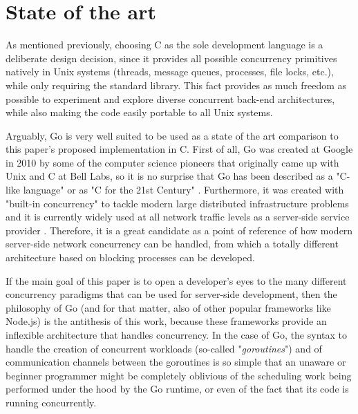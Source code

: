 \section{State of the art}
As mentioned previously, choosing C as the sole development language is a deliberate design decision, since it provides all possible concurrency primitives natively in Unix systems (threads, message queues, processes, file locks, etc.), while only requiring the standard library. This fact provides as much freedom as possible to experiment and explore diverse concurrent back-end architectures, while also making the code easily portable to all Unix systems.

Arguably, Go is very well suited to be used as a state of the art comparison to this paper's proposed implementation in C. First of all, Go was created at Google in 2010 by some of the computer science pioneers that originally came up with Unix and C at Bell Labs, so it is no surprise that Go has been described as a "C-like language" or as "C for the 21st Century" \cite{GoPL2015}. Furthermore, it was created with "built-in concurrency" to tackle modern large distributed infrastructure problems and it is currently widely used at all network traffic levels as a server-side service provider \cite{Pike2012}. Therefore, it is a great candidate as a point of reference of how modern server-side network concurrency can be handled, from which a totally different architecture based on blocking processes can be developed. 

If the main goal of this paper is to open a developer's eyes to the many different concurrency paradigms that can be used for server-side development, then the philosophy of Go (and for that matter, also of other popular frameworks like Node.js) is the antithesis of this work, because these frameworks provide an inflexible architecture that handles concurrency. In the case of Go, the syntax to handle the creation of concurrent workloads (so-called "\textit{goroutines}") and of communication channels between the goroutines is so simple that an unaware or beginner programmer might be completely oblivious of the scheduling work being performed under the hood by the Go runtime, or even of the fact that its code is running concurrently. 

